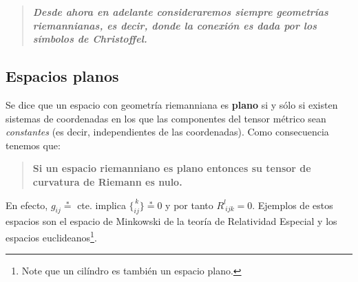 
\begin{tcolorbox}
\begin{quotation}
\textbf{\textit{Desde ahora en adelante consideraremos siempre geometrías riemannianas, es
decir, donde la conexión es dada por los símbolos de Christoffel.}}
\end{quotation}
\end{tcolorbox}

\subsection{Espacios planos}
Se dice que un espacio con geometría riemanniana es \textbf{plano} si y sólo si existen sistemas de coordenadas en los que las componentes del tensor métrico sean \textit{constantes} (es decir, independientes de las coordenadas). Como consecuencia tenemos que:
\begin{tcolorbox}
\begin{quotation}
\textbf{Si un espacio riemanniano es plano entonces su tensor de curvatura de Riemann es nulo.}
\end{quotation}
\end{tcolorbox}
En efecto, $g_{ij}\overset{\ast}{=}$ cte. implica $\{ _{ i j}^{\, k}\}
\overset{\ast}{=}0$ y por tanto $R_{\ i j k}^l=0$. Ejemplos de estos
espacios son el espacio de Minkowski de la teoría de Relatividad Especial y
los espacios euclideanos\footnote{Note que un cilíndro es también un espacio plano.}.

